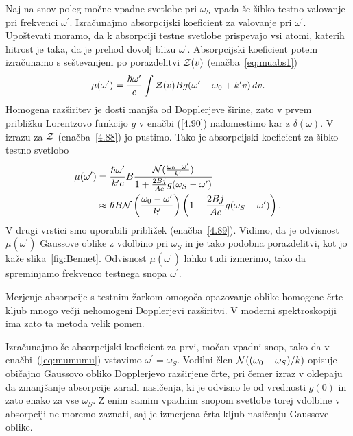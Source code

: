 Naj na snov poleg močne vpadne svetlobe pri $\omega_S$ vpada še šibko testno valovanje pri 
frekvenci $\omega^{\prime}$. Izračunajmo absorpcijski koeficient za valovanje pri $\omega^\prime$. 
Upoštevati moramo, da k absorpciji testne svetlobe prispevajo vsi atomi, katerih
hitrost je taka, da je prehod dovolj blizu $\omega^{\prime}$. Absorpcijski 
koeficient potem izračunamo s seštevanjem 
po porazdelitvi ${\cal Z}(v)$
(enačba~\ref{eq:muabs1})
\begin{equation}
\mu(\omega^{\prime})=\frac{\hslash\omega^{\prime}}{c}\int{\cal Z}(v)Bg(\omega^{\prime}-\omega_{0}+k'v)\, dv.
\label{4.90}
\end{equation}
Homogena razširitev je dosti manjša od Dopplerjeve širine, zato
v prvem približku Lorentzovo funkcijo $g$ v enačbi (\ref{4.90}) nadomestimo kar z
$\delta(\omega)$. V izrazu za $\cal Z$ (enačba~\ref{4.88}) jo pustimo. 
Tako je absorpcijski koeficient za šibko testno svetlobo 
\begin{align}
\label{eq:mumumu}
\mu(\omega^{\prime}) & =  \frac{\hslash\omega^{\prime}}{k'c}B\frac{{\cal N}
(\frac{\omega_0-\omega'}{k'})}{1+\frac{2Bj}{Ac}g(\omega_S-\omega')} \\ \nonumber 
 & \approx  \hslash B{\cal N}\left(\frac{\omega_0-\omega'}{k'}\right)\left(1-\frac{2Bj}{Ac}g(\omega_S-\omega')\right).
\end{align}
V drugi vrstici smo uporabili približek (enačba~\ref{4.89}). Vidimo, da je 
odvisnost $\mu(\omega^{\prime})$ Gaussove oblike z vdolbino pri $\omega_S$ in je tako
podobna porazdelitvi, kot jo kaže slika~\ref{fig:Bennet}. Odvisnost 
$\mu(\omega^{\prime})$ lahko tudi izmerimo, tako da spreminjamo 
frekvenco testnega snopa $\omega^{\prime}$.

\begin{remark}
 Merjenje absorpcije s testnim
žarkom omogoča opazovanje oblike homogene črte kljub mnogo večji
nehomogeni Dopplerjevi razširitvi. V moderni spektroskopiji ima zato ta metoda
velik pomen.
\end{remark}

Izračunajmo še absorpcijski koeficient za prvi, močan vpadni snop, tako da v
enačbi~(\ref{eq:mumumu}) vstavimo $\omega^{\prime}=\omega_S$. Vodilni člen ${\cal N}((\omega_0-
\omega_S)/k)$ opisuje običajno Gaussovo obliko Dopplerjevo
razširjene črte, pri čemer izraz v oklepaju da zmanjšanje absorpcije
zaradi nasičenja, ki je odvisno le od vrednosti $g(0)$ in zato enako za vse $\omega_S$. 
Z enim samim vpadnim snopom svetlobe torej vdolbine v absorpciji ne moremo zaznati, saj 
je izmerjena črta kljub nasičenju Gaussove oblike. 

